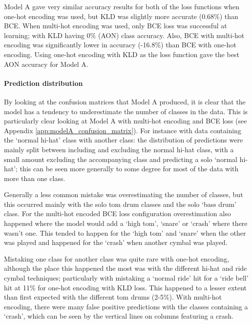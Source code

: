 \documentclass[12pt]{article}
\begin{document}
	Model A gave very similar accuracy results for both of the loss functions when one-hot encoding was used, but KLD was slightly more accurate (0.68\%) than BCE. When multi-hot encoding was used, only BCE loss was successful at learning; with KLD having 0\% (AON) class accuracy. Also, BCE with multi-hot encoding was significantly lower in accuracy (-16.8\%) than BCE with one-hot encoding. Using one-hot encoding with KLD as the loss function gave the best AON accuracy for Model A.\medskip
	
	\paragraph*{Prediction distribution}
	
	By looking at the confusion matrices that Model A produced, it is clear that the model has a tendency to underestimate the number of classes in the data. This is particularly clear looking at Model A with multi-hot encoding and BCE loss (see Appendix \ref{app:modelA_confusion_matrix}). For instance with data containing the `normal hi-hat' class with another class: the distribution of predictions were mainly split between including and excluding the normal hi-hat class, with a small amount excluding the accompanying class and predicting a solo `normal hi-hat'; this can be seen more generally to some degree for most of the data with more than one class.\medskip
	
	Generally a less common mistake was overestimating the number of classes, but this occurred mainly with the solo tom drum classes and the solo `bass drum' class. For the multi-hot encoded BCE loss configuration overestimation also happened where the model would add a `high tom', `snare' or `crash' where there wasn't one. This tended to happen for the `high tom' and `snare' when the other was played and happened for the `crash' when another cymbal was played.\medskip
	
	Mistaking one class for another class was quite rare with one-hot encoding, although the place this happened the most was with the different hi-hat and ride cymbal techniques; particularly with mistaking a `normal ride' hit for a `ride bell' hit at 11\% for one-hot encoding with KLD loss. This happened to a lesser extent than first expected with the different tom drums (2-5\%). With multi-hot encoding, there were many false positive predictions with the classes containing a `crash', which can be seen by the vertical lines on columns featuring a crash.\medskip
	
\end{document}
